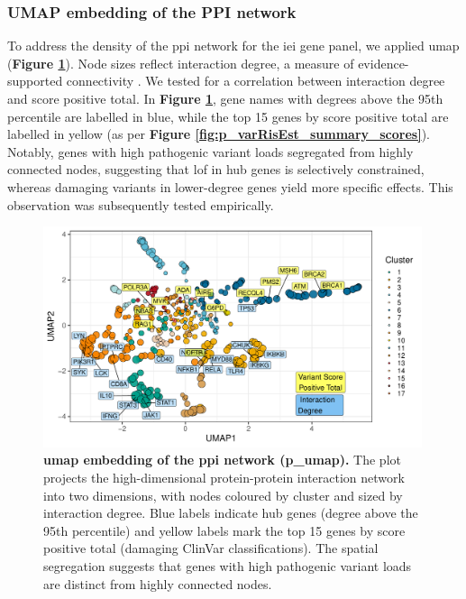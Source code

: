 \FloatBarrier
\subsubsection{UMAP embedding of the PPI  network}
To address the density of the \ac{ppi} network for the \ac{iei} gene panel, we applied \ac{umap} (\textbf{Figure \ref{fig:p_umap}}). 
Node sizes reflect interaction degree, a measure of evidence-supported connectivity \cite{szklarczyk2025string}. We tested for a correlation between interaction degree and score positive total. In \textbf{Figure \ref{fig:p_umap}}, gene names with degrees above the 95th percentile are labelled in blue, while the top 15 genes by score positive total are labelled in yellow (as per \textbf{Figure \ref{fig:p_varRisEst_summary_scores}}). Notably, genes with high pathogenic variant loads segregated from highly connected nodes, suggesting that \ac{lof} in hub genes is selectively constrained, whereas damaging variants in lower-degree genes yield more specific effects. This observation was subsequently tested empirically.

\begin{figure}[ht]
  \centering
  \includegraphics[width=0.99\textwidth]{../images/untangleR_ppi_network_umap.pdf}
  \caption{
    \textbf{\ac{umap} embedding of the \ac{ppi} network (p\_umap).} 
    The plot projects the high-dimensional protein-protein interaction network into two dimensions, with nodes coloured by cluster and sized by interaction degree. Blue labels indicate hub genes (degree above the 95th percentile) and yellow labels mark the top 15 genes by score positive total (damaging ClinVar classifications). The spatial segregation suggests that genes with high pathogenic variant loads are distinct from highly connected nodes.
  }
  \label{fig:p_umap}
\end{figure}

